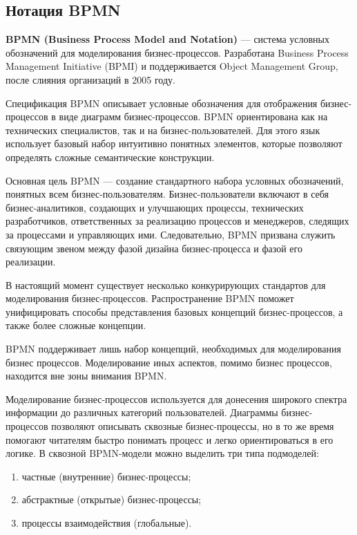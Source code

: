 \documentclass[russian,utf8,emptystyle]{eskdtext}
\begin{document}
\subsection{Нотация BPMN}
\textbf{BPMN (Business Process Model and Notation)} — система условных обозначений для моделирования бизнес-процессов. Разработана Business Process Management Initiative (BPMI) и поддерживается Object Management Group, после слияния организаций в 2005 году.

Спецификация BPMN описывает условные обозначения для отображения бизнес-процессов в виде диаграмм бизнес-процессов. BPMN ориентирована как на технических специалистов, так и на бизнес-пользователей. Для этого язык использует базовый набор интуитивно понятных элементов, которые позволяют определять сложные семантические конструкции.

Основная цель BPMN — создание стандартного набора условных обозначений, понятных всем бизнес-пользователям. Бизнес-пользователи включают в себя бизнес-аналитиков, создающих и улучшающих процессы, технических разработчиков, ответственных за реализацию процессов и менеджеров, следящих за процессами и управляющих ими. Следовательно, BPMN призвана служить связующим звеном между фазой дизайна бизнес-процесса и фазой его реализации.

В настоящий момент существует несколько конкурирующих стандартов для моделирования бизнес-процессов. Распространение BPMN поможет унифицировать способы представления базовых концепций бизнес-процессов, а также более сложные концепции.

BPMN поддерживает лишь набор концепций, необходимых для моделирования бизнес процессов. Моделирование иных аспектов, помимо бизнес процессов, находится вне зоны внимания BPMN.

Моделирование бизнес-процессов используется для донесения широкого спектра информации до различных категорий пользователей. Диаграммы бизнес-процессов позволяют описывать сквозные бизнес-процессы, но в то же время помогают читателям быстро понимать процесс и легко ориентироваться в его логике. В сквозной BPMN-модели можно выделить три типа подмоделей:
\begin{enumerate}[label=\arabic*)]
\item частные (внутренние) бизнес-процессы;
\item абстрактные (открытые) бизнес-процессы;
\item процессы взаимодействия (глобальные).
\end{enumerate}
\end{document}
